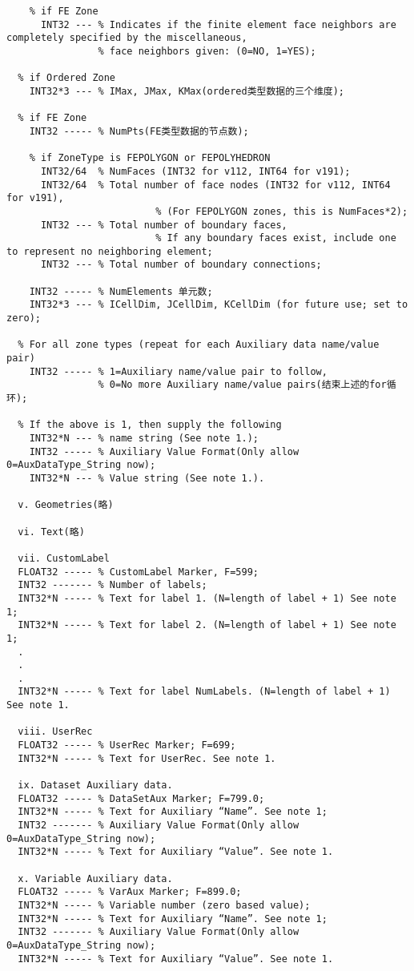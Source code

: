 \documentclass[lang=cn,11pt,a4paper]{elegantpaper}
\begin{document}
\begin{lstlisting}
    % if FE Zone
      INT32 --- % Indicates if the finite element face neighbors are completely specified by the miscellaneous,
                % face neighbors given: (0=NO, 1=YES);

  % if Ordered Zone
    INT32*3 --- % IMax, JMax, KMax(ordered类型数据的三个维度);

  % if FE Zone
    INT32 ----- % NumPts(FE类型数据的节点数);

    % if ZoneType is FEPOLYGON or FEPOLYHEDRON
      INT32/64  % NumFaces (INT32 for v112, INT64 for v191);
      INT32/64  % Total number of face nodes (INT32 for v112, INT64 for v191),
                          % (For FEPOLYGON zones, this is NumFaces*2);
      INT32 --- % Total number of boundary faces,
                          % If any boundary faces exist, include one to represent no neighboring element;
      INT32 --- % Total number of boundary connections;

    INT32 ----- % NumElements 单元数;
    INT32*3 --- % ICellDim, JCellDim, KCellDim (for future use; set to zero);

  % For all zone types (repeat for each Auxiliary data name/value pair)
    INT32 ----- % 1=Auxiliary name/value pair to follow,
                % 0=No more Auxiliary name/value pairs(结束上述的for循环);

  % If the above is 1, then supply the following
    INT32*N --- % name string (See note 1.);
    INT32 ----- % Auxiliary Value Format(Only allow 0=AuxDataType_String now);
    INT32*N --- % Value string (See note 1.).

  v. Geometries(略)

  vi. Text(略)

  vii. CustomLabel
  FLOAT32 ----- % CustomLabel Marker, F=599;
  INT32 ------- % Number of labels;
  INT32*N ----- % Text for label 1. (N=length of label + 1) See note 1;
  INT32*N ----- % Text for label 2. (N=length of label + 1) See note 1;
  .
  .
  .
  INT32*N ----- % Text for label NumLabels. (N=length of label + 1) See note 1.

  viii. UserRec
  FLOAT32 ----- % UserRec Marker; F=699;
  INT32*N ----- % Text for UserRec. See note 1.

  ix. Dataset Auxiliary data.
  FLOAT32 ----- % DataSetAux Marker; F=799.0;
  INT32*N ----- % Text for Auxiliary “Name”. See note 1;
  INT32 ------- % Auxiliary Value Format(Only allow 0=AuxDataType_String now);
  INT32*N ----- % Text for Auxiliary “Value”. See note 1.

  x. Variable Auxiliary data.
  FLOAT32 ----- % VarAux Marker; F=899.0;
  INT32*N ----- % Variable number (zero based value);
  INT32*N ----- % Text for Auxiliary “Name”. See note 1;
  INT32 ------- % Auxiliary Value Format(Only allow 0=AuxDataType_String now);
  INT32*N ----- % Text for Auxiliary “Value”. See note 1.
\end{lstlisting}
\end{document}
